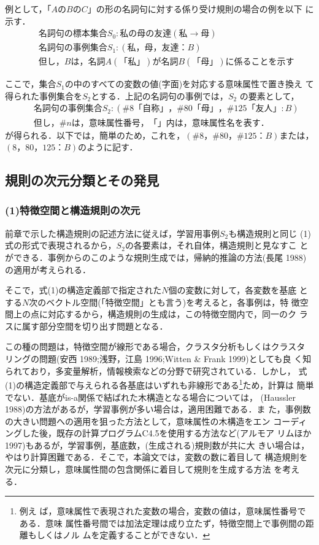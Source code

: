 例として，「$AのBのC$」の形の名詞句に対する係り受け規則の場合の例を以下
に示す．
\begin{eqnarray}
 &&名詞句の標本集合{S_0}:私の母の友達(私\rightarrow 母)\nonumber \\
 &&名詞句の事例集合{S_1}:(私，母，友達：{B})\\
 &&但し，{B}は，名詞A(「私」)が名詞B(「母」)に係ることを示す\nonumber
\end{eqnarray}

ここで，集合${S_1}$の中のすべての変数の値(字面)を対応する意味属性で置き換え
て得られた事例集合を${S_2}$とする．上記の名詞句の事例では，${S_2}$
の要素として，
\begin{eqnarray}
 &&名詞句の事例集合{S_2}:(\#8「自称」，\#80「母」，\#125「友人」:B)\\
 &&但し，\#{n}は，意味属性番号，「」内は，意味属性名を表す．\nonumber
\end{eqnarray}
が得られる．以下では，簡単のため，これを，$(\#8，\#80，\#125：B)$または，
$(8，80，125：B)$のように記す．
\subsection{規則の次元分類とその発見}
\subsubsection*{(1)特徴空間と構造規則の次元}

前章で示した構造規則の記述方法に従えば，学習用事例${S_2}$も構造規則と同じ
(1)式の形式で表現されるから，${S_2}$の各要素は，それ自体，構造規則と見なすこ
とができる．事例からのこのような規則生成では，帰納的推論の方法(長尾
1988)の適用が考えられる．

そこで，式(1)の構造定義部で指定された$N$個の変数に対して，各変数を基底
とする$N$次のベクトル空間(「特徴空間」とも言う)を考えると，各事例は，特
徴空間上の点に対応するから，構造規則の生成は，この特徴空間内で，同一のク
ラスに属す部分空間を切り出す問題となる．

この種の問題は，特徴空間が線形である場合，クラスタ分析もしくはクラスタ
リングの問題(安西 1989;浅野，江島 1996;Witten \& Frank 1999)としても良
く知られており，多変量解析，情報検索などの分野で研究されている．しかし，
式(1)の構造定義部で与えられる各基底はいずれも非線形である\footnote{例え
ば，意味属性で表現された変数の場合，変数の値は，意味属性番号である．意味
属性番号間では加法定理は成り立たず，特徴空間上で事例間の距離もしくはノル
ムを定義することができない．}ため，計算は
簡単でない．基底がis-a関係で結ばれた木構造となる場合については，
(Haussler 1988)の方法があるが，学習事例が多い場合は，適用困難である．ま
た，事例数の大きい問題への適用を狙った方法として，意味属性の木構造をエン
コーディングした後，既存の計算プログラムC4.5を使用する方法など(アルモア
リムほか 1997)もあるが，学習事例，基底数，(生成される)規則数が共に大
きい場合は，やはり計算困難である．そこで，本論文では，変数の数に着目して
構造規則を次元に分類し，意味属性間の包含関係に着目して規則を生成する方法
を考える．

